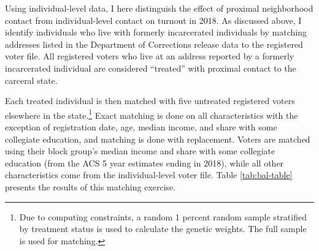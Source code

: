 \documentclass[
  12pt,
]{article}
\begin{document}
Using individual-level data, I here distinguish the effect of proximal neighborhood contact from individual-level contact on turnout in 2018. As discussed above, I identify individuals who live with formerly incarcerated individuals by matching addresses listed in the Department of Corrections release data to the registered voter file. All registered voters who live at an address reported by a formerly incarcerated individual are considered ``treated'' with proximal contact to the carceral state.

Each treated individual is then matched with five untreated registered voters elsewhere in the state.\footnote{Due to computing constraints, a random 1 percent random sample stratified by treatment status is used to calculate the genetic weights. The full sample is used for matching.} Exact matching is done on all characteristics with the exception of registration date, age, median income, and share with some collegiate education, and matching is done with replacement. Voters are matched using their block group's median income and share with some collegiate education (from the ACS 5 year estimates ending in 2018), while all other characteristics come from the individual-level voter file. Table \ref{tab:bal-table} presents the results of this matching exercise.
\end{document}
